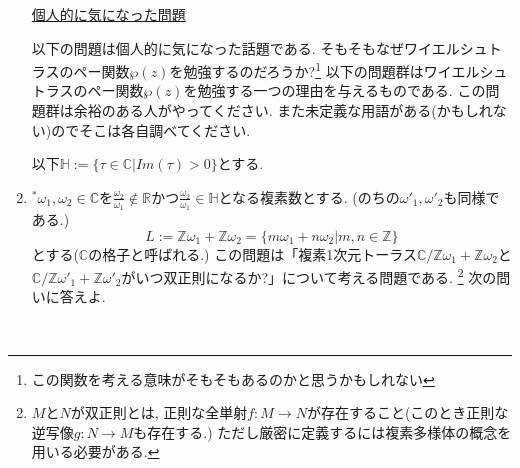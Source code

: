 \documentclass[dvipdfmx,a4paper,11pt]{article}
\newcommand{\R}{\mathbb{R}}
\newcommand{\Z}{\mathbb{Z}}
\newcommand{\C}{\mathbb{C}}
\theoremstyle{definition}
\begin{document}
\begin{enumerate}[label=\textbf{問}5.\arabic*]
\vspace{12pt}
\hspace{-24pt}\underline{個人的に気になった問題}     
     
以下の問題は個人的に気になった話題である.
 そもそもなぜワイエルシュトラスのペー関数$\wp(z)$を勉強するのだろうか?\footnote{この関数を考える意味がそもそもあるのかと思うかもしれない} 
 以下の問題群はワイエルシュトラスのペー関数$\wp(z)$を勉強する一つの理由を与えるものである.
 この問題群は余裕のある人がやってください. また未定義な用語がある(かもしれない)のでそこは各自調べてください. 
 
 以下$\mathbb{H} := \{ \tau \in \C | Im(\tau)>0\}$とする.
\item $^{*}$$\omega_1, \omega_2 \in \C$を$\frac{\omega_2}{\omega_1} \not\in \R$かつ$\frac{\omega_2}{\omega_1} \in \mathbb{H}$となる複素数とする. (のちの$\omega'_1, \omega'_2$も同様である.)
$$L :=\Z  \omega_1 + \Z \omega_2=\{ m\omega_1 + n \omega_2 | m,n\in \Z\}$$
とする($\C$の格子と呼ばれる.)
この問題は「複素1次元トーラス$\C/\Z  \omega_1 + \Z \omega_2$と$\C/\Z  \omega'_1 + \Z \omega'_2$がいつ双正則になるか?」について考える問題である. \footnote{$M$と$N$が双正則とは, 正則な全単射$f : M \to N$が存在すること(このとき正則な逆写像$g : N \to M$も存在する.) ただし厳密に定義するには複素多様体の概念を用いる必要がある.  }
次の問いに答えよ.
 $$
\end{enumerate}
\end{document}
